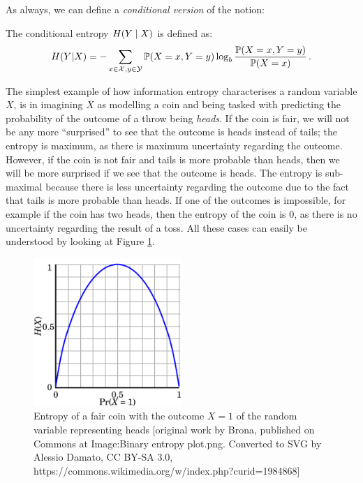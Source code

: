 As always, we can define a \textit{conditional version} of the notion:
\begin{definition} \label{def:conditional-entropy}
	The conditional entropy $H(Y \mid X)$ is defined as:
\begin{equation*}
	H(Y | X)=-\sum_{x \in \mathcal{X}, y \in \mathcal{Y}} \mathbb{P}(X=x,Y=y) \log_{b} \frac{\mathbb{P}(X=x,Y=y)}{\mathbb{P}(X=x)} \,.
\end{equation*}
\end{definition}

The simplest example of how information entropy characterises a random variable $X$, is in imagining $X$ as modelling a coin and being tasked with predicting the probability of the outcome of a throw being \textit{heads}.
If the coin is fair, we will not be any more \enquote{surprised} to see that the outcome is heads instead of tails; the entropy is maximum, as there is maximum uncertainty regarding the outcome.
However, if the coin is not fair and tails is more probable than heads, then we will be more surprised if we see that the outcome is heads.  
The entropy is sub-maximal because there is less uncertainty regarding the outcome due to the fact that tails is more probable than heads.
If one of the outcomes is impossible, for example if the coin has two heads, then the entropy of the coin is $0$, as there is no uncertainty regarding the result of a toss.
All these cases can easily be understood by looking at Figure \ref{fig:entropy-plot}.



\begin{figure}[htbp]
\centerline{\includegraphics[width=0.5\textwidth]{mathematical-background/images/entropy-plot}}
\caption{Entropy of a fair coin with the outcome $X=1$ of the random variable representing heads [original work by Brona, published on Commons at Image:Binary entropy plot.png. Converted to SVG by Alessio Damato, CC BY-SA 3.0, https://commons.wikimedia.org/w/index.php?curid=1984868]}
\label{fig:entropy-plot}
\end{figure}

